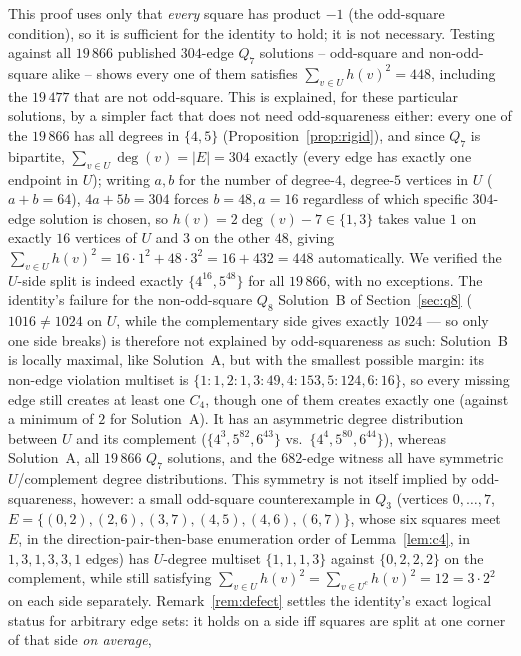 \documentclass[12pt,a4paper]{article}
\theoremstyle{definition}
\begin{document}
This proof uses only that \emph{every} square has product $-1$ (the
odd-square condition), so it is sufficient for the identity to hold; it
is not necessary. Testing against all $19\,866$ published $304$-edge
$Q_7$ solutions -- odd-square and non-odd-square alike -- shows every
one of them satisfies $\sum_{v\in U}h(v)^2=448$, including the
$19\,477$ that are not odd-square. This is explained, for these
particular solutions, by a simpler fact that does not need
odd-squareness either: every one of the $19\,866$ has all degrees in
$\{4,5\}$ (Proposition~\ref{prop:rigid}), and since $Q_7$ is bipartite,
$\sum_{v\in U}\deg(v)=|E|=304$ exactly (every edge has exactly one
endpoint in $U$); writing $a,b$ for the number of degree-$4$,
degree-$5$ vertices in $U$ ($a+b=64$), $4a+5b=304$ forces $b=48,a=16$
regardless of which specific $304$-edge solution is chosen, so
$h(v)=2\deg(v)-7\in\{1,3\}$ takes value $1$ on exactly $16$ vertices of
$U$ and $3$ on the other $48$, giving
$\sum_{v\in U}h(v)^2=16\cdot1^2+48\cdot3^2=16+432=448$ automatically.
We verified the $U$-side split is indeed exactly $\{4^{16},5^{48}\}$
for all $19\,866$, with no exceptions. The identity's failure for the
non-odd-square $Q_8$ Solution~B of Section~\ref{sec:q8} ($1016\ne1024$ on
$U$, while the complementary side gives exactly $1024$ --- so only one side
breaks)
is therefore not explained by odd-squareness as such: Solution~B is locally maximal, like Solution~A, but with the smallest possible
margin: its non-edge violation multiset is
$\{1{:}1,2{:}1,3{:}49,4{:}153,5{:}124,6{:}16\}$, so every missing edge still
creates at least one $C_4$, though one of them creates exactly one (against a
minimum of $2$ for Solution~A). It has an
asymmetric degree distribution between $U$ and its complement
($\{4^3,5^{82},6^{43}\}$ vs.\ $\{4^4,5^{80},6^{44}\}$), whereas
Solution~A, all $19\,866$ $Q_7$ solutions, and the $682$-edge witness all
have symmetric $U$/complement degree distributions. This symmetry is
not itself implied by odd-squareness, however: a small odd-square
counterexample in $Q_3$ (vertices $0,\ldots,7$,
$E=\{(0,2),(2,6),(3,7),(4,5),(4,6),(6,7)\}$, whose six squares meet $E$,
in the direction-pair-then-base enumeration order of Lemma~\ref{lem:c4},
in $1,3,1,3,3,1$ edges) has $U$-degree multiset $\{1,1,1,3\}$ against
$\{0,2,2,2\}$ on the complement, while still satisfying
$\sum_{v\in U}h(v)^2=\sum_{v\in U^c}h(v)^2=12=3\cdot2^2$ on each side
separately. Remark~\ref{rem:defect} settles the identity's exact
logical status for arbitrary edge sets: it holds on a side iff squares are
split at one corner of that side \emph{on average},
\end{document}

